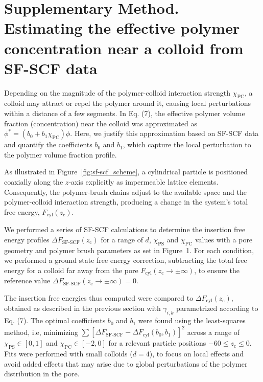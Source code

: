 \documentclass[10pt, a4paper]{article}
\begin{document}
\section{Supplementary Method. Estimating the effective polymer concentration near a colloid from SF-SCF data}
\begin{multicols}{2}

Depending on the magnitude of the polymer-colloid interaction strength $\chi_{\text{PC}}$, a colloid may attract or repel the polymer around it, causing local perturbations within a distance of a few segments.
In Eq. (7), the effective polymer volume fraction (concentration) near the colloid was approximated as $\phi^{\ast} = (b_0 + b_1 \chi_{\text{PC}}) \phi$.
Here, we justify this approximation based on SF-SCF data and quantify the coefficients $b_0$ and $b_1$, which capture the local perturbation to the polymer volume fraction profile.

As illustrated in Figure~\ref{fig:sf-scf_scheme}, a cylindrical particle is positioned coaxially along the $z$‑axis explicitly as impermeable lattice elements.
Consequently, the polymer‑brush chains adjust to the available space and the polymer-colloid interaction strength, producing a change in the system's total free energy, $F_{\text{cyl}}(z_{\text{c}})$.

We performed a series of SF-SCF calculations to determine the insertion free energy profiles $\Delta F_{\text{SF-SCF}}(z_{\text{c}})$ for a range of $d$, $\chi_{\text{PS}}$ and $\chi_{\text{PC}}$ values with a pore geometry and polymer brush parameters as set in Figure~1.
For each condition, we performed a ground state free energy correction, subtracting the total free energy for a colloid far away from the pore $F_{\text{cyl}}(z_{\text{c}} \to \pm \infty)$, to ensure the reference value $\Delta F_{\text{SF-SCF}}(z_{\text{c}} \to \pm \infty) = 0$.

The insertion free energies thus computed were compared to $\Delta F_{\text{cyl}}(z_{\text{c}})$, obtained as described in the previous section with $\gamma_{i,k}$ parametrized according to Eq. (7).
The optimal coefficients $b_0$ and $b_1$ were found using the least-squares method, i.e, minimizing $\sum [\Delta F_{\text{SF-SCF}} - \Delta F_{\text{cyl}}(b_0,b_1)]^2$ across a range of $\chi_{\text{PS}} \in [0,1]$  and $\chi_{\text{PC}} \in [-2,0]$ for a relevant particle positions $-60 \leq z_{\text{c}} \leq 0$.
Fits were performed with small colloids ($d=4$), to focus on local effects and avoid added effects that may arise due to global perturbations of the polymer distribution in the pore.


\end{multicols}
\end{document}
